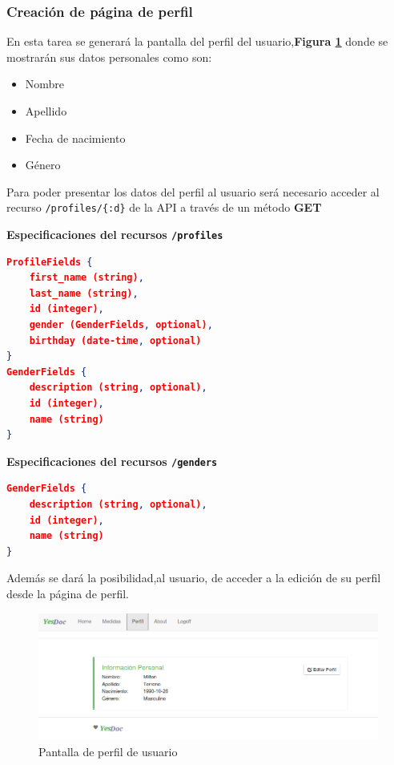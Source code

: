  
\subsubsection{Creación de página de perfil}
En esta tarea  se generará la pantalla del perfil del usuario,\textbf{Figura \ref{perfil}} donde se mostrarán sus datos personales como son:
      \begin{itemize}
	      \item Nombre
          \item Apellido
          \item Fecha de nacimiento
          \item Género
      \end{itemize}
      Para poder presentar los datos del perfil al usuario será necesario  acceder al recurso \texttt{/profiles/\{:d\}} de la API a través de un método 		\textbf{GET}
      
	\textbf{Especificaciones del recursos \texttt{/profiles}}
    
        \begin{lstlisting}[language=json,firstnumber=1]
ProfileFields {
	first_name (string),
	last_name (string),
	id (integer),
	gender (GenderFields, optional),
	birthday (date-time, optional)
}
GenderFields {
	description (string, optional),
	id (integer),
	name (string)
} 
        \end{lstlisting}

	\textbf{Especificaciones del recursos \texttt{/genders}}
        \begin{lstlisting}[language=json,firstnumber=1]
GenderFields {
	description (string, optional),
	id (integer),
	name (string)
} 
        \end{lstlisting}

Además se dará la posibilidad,al usuario, de acceder a la edición de su perfil desde la página de perfil. 


    \begin{figure}[h]
        \centering
        \includegraphics[width=1\textwidth]{img/tp1_parte2/1-perfil}
        \caption{Pantalla de perfil de usuario}
		\label{perfil}
    \end{figure}

